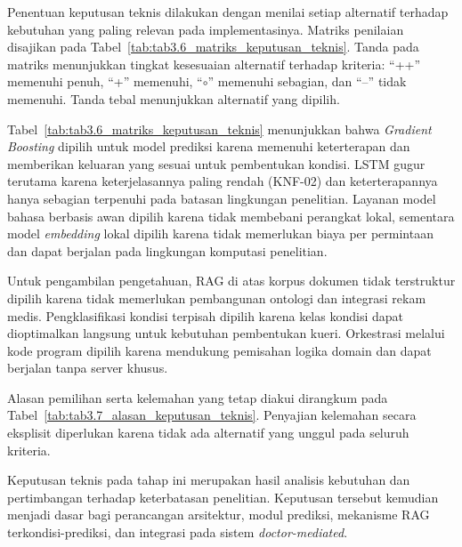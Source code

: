 Penentuan keputusan teknis dilakukan dengan menilai setiap alternatif terhadap kebutuhan yang paling relevan pada implementasinya. Matriks penilaian disajikan pada
Tabel~\ref{tab:tab3.6_matriks_keputusan_teknis}. Tanda pada matriks menunjukkan tingkat kesesuaian alternatif terhadap kriteria: ``++'' memenuhi penuh, ``+'' memenuhi, ``$\circ$'' 
memenuhi sebagian, dan ``--'' tidak memenuhi. Tanda tebal menunjukkan alternatif yang dipilih.



Tabel~\ref{tab:tab3.6_matriks_keputusan_teknis} menunjukkan bahwa \textit{Gradient Boosting} dipilih untuk model prediksi karena memenuhi keterterapan dan memberikan keluaran
yang sesuai untuk pembentukan kondisi. LSTM gugur terutama karena keterjelasannya paling rendah (KNF-02) dan keterterapannya hanya sebagian terpenuhi pada batasan lingkungan
penelitian. Layanan model bahasa berbasis awan dipilih karena tidak membebani perangkat lokal, sementara model \textit{embedding} lokal dipilih karena tidak memerlukan biaya per
permintaan dan dapat berjalan pada lingkungan komputasi penelitian.

Untuk pengambilan pengetahuan, RAG di atas korpus dokumen tidak terstruktur dipilih karena tidak memerlukan pembangunan ontologi dan integrasi rekam medis. Pengklasifikasi kondisi
terpisah dipilih karena kelas kondisi dapat dioptimalkan langsung untuk kebutuhan pembentukan kueri. Orkestrasi melalui kode program dipilih karena mendukung pemisahan logika domain 
dan dapat berjalan tanpa server khusus.

Alasan pemilihan serta kelemahan yang tetap diakui dirangkum pada Tabel~\ref{tab:tab3.7_alasan_keputusan_teknis}. Penyajian kelemahan secara eksplisit diperlukan karena tidak ada
alternatif yang unggul pada seluruh kriteria.



Keputusan teknis pada tahap ini merupakan hasil analisis kebutuhan dan pertimbangan terhadap keterbatasan penelitian. Keputusan tersebut kemudian menjadi dasar bagi perancangan
arsitektur, modul prediksi, mekanisme RAG terkondisi-prediksi, dan integrasi pada sistem \textit{doctor-mediated}.